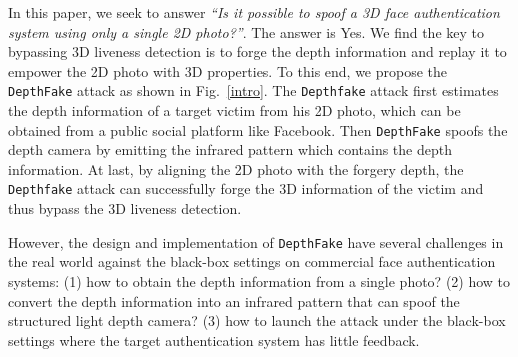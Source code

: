 In this paper, we seek to answer \emph{``Is it possible to spoof a 3D face authentication system using only a single 2D photo?''}.
The answer is Yes. We find the key to bypassing 3D liveness detection is to forge the depth information and replay it to empower the 2D photo with 3D properties. To this end, we propose the \texttt{DepthFake} attack as shown in Fig.~\ref{intro}. The \texttt{Depthfake} attack first estimates the depth information of a target victim from his 2D photo, which can be obtained from a public social platform like Facebook. Then \texttt{DepthFake} spoofs the depth camera by emitting the infrared pattern which contains the depth information. At last, by aligning the 2D photo with the forgery depth, the \texttt{Depthfake} attack can successfully forge the 3D information of the victim and thus bypass the 3D liveness detection.


However, the design and implementation of \texttt{DepthFake} have several challenges in the real world  against the black-box settings on commercial face authentication systems:
(1) how to obtain the depth information from a single photo?
(2) how to convert the depth information into an infrared pattern that can spoof the structured light depth camera?
(3) how to launch the attack under the black-box settings where the target authentication system has little feedback. 


